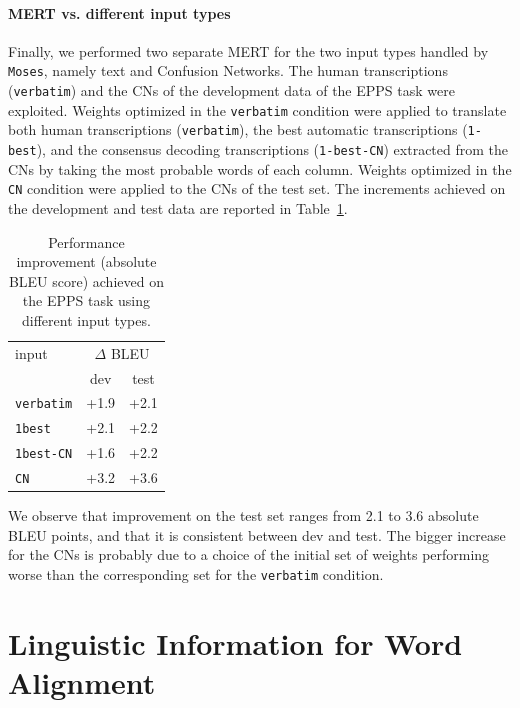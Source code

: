 \documentclass[10pt]{report}
\theoremstyle{plain}
\begin{document}
{\paragraph{MERT vs. different input types} Finally, we performed two separate MERT for the two input types handled by {\tt Moses}, namely text and Confusion Networks. The human transcriptions ({\tt verbatim}) and the CNs of the development data of the EPPS task were exploited. Weights optimized in the {\tt verbatim} condition were applied to translate both human transcriptions ({\tt verbatim}), the best automatic transcriptions ({\tt 1-best}),  and the consensus decoding transcriptions ({\tt 1-best-CN}) extracted from the CNs \cite{mangu:00} by taking the most probable words of  each column. Weights optimized in the {\tt CN} condition were applied to the CNs of the test set.
The increments achieved on the development and test data are reported in Table~\ref{tbl:MERT-epps-summary}.


 \begin{table}[ht]
\begin{center}
\label{tbl:MERT-epps-summary}
\begin{tabular}{l|cc}
input                    &\multicolumn{2}{c}{$\Delta$ BLEU}\\
                             & dev & test\\
\hline
{\tt verbatim}  &  +1.9 & +2.1\\
{\tt 1best}        &  +2.1 & +2.2\\
{\tt 1best-CN} &  +1.6 & +2.2\\
\hline
{\tt CN}            &  +3.2 & +3.6\\
\end{tabular}
\caption{Performance improvement  (absolute BLEU score) achieved on the EPPS task using different input types.}
\end{center}
\end{table}

We observe that improvement on the test set ranges from 2.1 to 3.6 absolute BLEU points, and that it is consistent between dev and test. The bigger increase for the CNs is probably due to a choice of the initial set of weights performing worse than the corresponding set for the {\tt verbatim} condition.


\section{Linguistic Information for Word Alignment}

}
\end{document}
